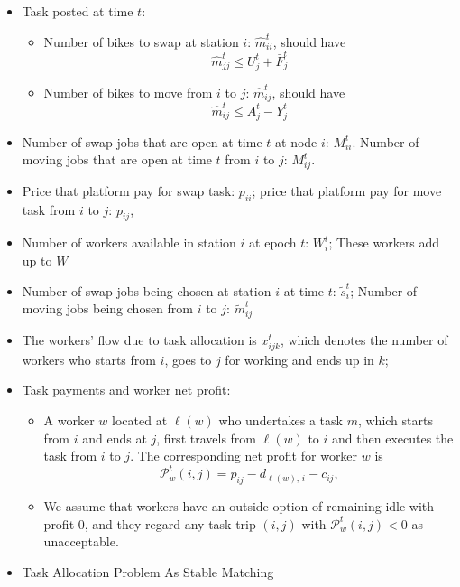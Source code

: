 \documentclass[trsc,nonblindrev]{informs3noheader}
\begin{document}
\begin{itemize}
    \item Task posted at time $t$: 
    \begin{itemize}
    \item Number of bikes to swap at station $i$: $\hat{m}_{ii}^t$, should have
    \[
    \hat{m}_{jj}^t\leq U_j^t + \bar{F}_j^t
    \]
    \item Number of bikes to move from $i$ to $j$: $\hat{m}_{ij}^t$, should have
    \[
    \hat{m}_{ij}^t\le A_j^t - Y_j^t
    \]
     \end{itemize}
     
     \item Number of swap jobs that are open at time $t$ at node $i$: $M_{ii}^t$. Number of moving jobs that are open at time $t$ from $i$ to $j$: $M_{ij}^t$.

     \item Price that platform pay for swap task: $p_{ii}$; price that platform pay for move task from $i$ to $j$: $p_{ij}$, 
     
     \item Number of workers available in station $i$ at epoch $t$: $W_i^t$; These workers add up to $W$
     \item Number of swap jobs being chosen at station $i$ at time $t$:  $\tilde{s}_i^t$; Number of moving jobs being chosen from $i$ to $j$: $\tilde{m}_{ij}^t$

     \item The workers' flow due to task allocation is $x_{ijk}^t$, which denotes the number of workers who starts from $i$, goes to $j$ for working and ends up in $k$;

    \item Task payments and worker net profit:
    \begin{itemize}
        \item A worker $w$ located at $\ell(w)$ who undertakes a task $m$, which starts from $i$ and ends at $j$, first travels from $\ell(w)$ to $i$ and then executes the task from $i$ to $j$.
        The corresponding net profit for worker $w$ is
        \[
            \mathcal{P}_w^t(i,j) = p_{ij} - d_{\ell(w),\,i} - c_{ij},
        \]
        
        \item We assume that workers have an outside option of remaining idle with profit $0$, and they regard any task trip $(i,j)$ with $\mathcal{P}_w^t(i,j)  < 0$ as unacceptable.
    \end{itemize}

    \item Task Allocation Problem As Stable Matching


\end{itemize}
\end{document}
